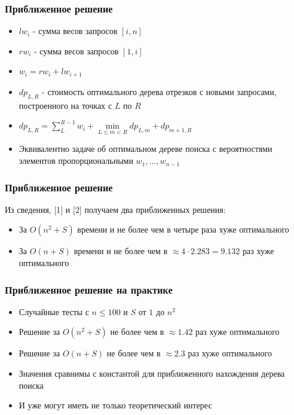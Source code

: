 \documentclass{beamer}
\begin{document}
\begin{frame}
\frametitle{Приближенное решение}

\begin{itemize}
\item $lw_i$ - сумма весов запросов $[i, n]$
\item $rw_i$ - сумма весов запросов $[1, i]$
\item $w_i = rw_i + lw_{i + 1}$
\item $dp_{L, R}$ - стоимость оптимального дерева отрезков с новыми запросами, построенного на точках с $L$ по $R$ 
\item $dp_{L, R} = \sum \limits_{L}^{R - 1} w_i + \min \limits_{L \le m < R} {dp_{L, m} + dp_{m + 1, R}}$
\item Эквивалентно задаче об оптимальном дереве поиска с вероятностями элементов пропорциональными $w_1,\dots,w_{n-1}$
\end{itemize}

\end{frame}


\begin{frame}
\frametitle{Приближенное решение}

Из сведения, [1] и [2] получаем два приближенных решения:

\begin{itemize}
\item За $O(n^2 + S)$ времени и не более чем в четыре раза хуже оптимального
\item За $O(n + S)$ времени и не более чем в $\approx 4 \cdot 2.283 = 9.132$ раз хуже оптимального
\end{itemize}

\end{frame}


\begin{frame}
\frametitle{Приближенное решение на практике}

\begin{itemize}
\item Случайные тесты с $n \le 100$ и $S$ от $1$ до $n^2$
\item Решение за $O(n^2 + S)$ не более чем в $\approx 1.42$ раз хуже оптимального
\item Решение за $O(n + S)$ не более чем в $\approx 2.3$ раз хуже оптимального
\item Значения сравнимы с константой для приближенного нахождения дерева поиска
\item И уже могут иметь не только теоретический интерес
\end{itemize}

\end{frame}
\end{document}

